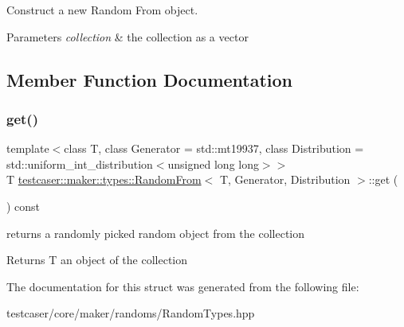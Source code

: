 Construct a new Random From object. 


\begin{DoxyParams}{Parameters}
{\em collection} & the collection as a vector \\
\hline
\end{DoxyParams}


\subsection{Member Function Documentation}
\mbox{\label{structtestcaser_1_1maker_1_1types_1_1RandomFrom_a6f72354c54f49a18de70b057a3b0f04b}} 
\subsubsection{\texorpdfstring{get()}{get()}}
{\footnotesize\ttfamily template$<$class T, class Generator = std\+::mt19937, class Distribution = std\+::uniform\+\_\+int\+\_\+distribution$<$unsigned long long$>$$>$ \\
T \hyperlink{structtestcaser_1_1maker_1_1types_1_1RandomFrom}{testcaser\+::maker\+::types\+::\+Random\+From}$<$ T, Generator, Distribution $>$\+::get (\begin{DoxyParamCaption}{ }\end{DoxyParamCaption}) const\hspace{0.3cm}{\ttfamily [inline]}}



returns a randomly picked random object from the collection 

\begin{DoxyReturn}{Returns}
T an object of the collection 
\end{DoxyReturn}


The documentation for this struct was generated from the following file\+:\begin{DoxyCompactItemize}
\item 
testcaser/core/maker/randoms/Random\+Types.\+hpp\end{DoxyCompactItemize}
